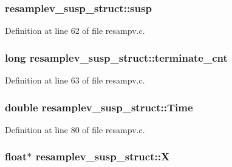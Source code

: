 \subsubsection[{\texorpdfstring{susp}{susp}}]{ resamplev\+\_\+susp\+\_\+struct\+::susp}\hypertarget{structresamplev__susp__struct_a3cff55d39d48a620fe191cce27d1cb21}{}\label{structresamplev__susp__struct_a3cff55d39d48a620fe191cce27d1cb21}


Definition at line 62 of file resampv.\+c.

\subsubsection[{\texorpdfstring{terminate\+\_\+cnt}{terminate_cnt}}]{\setlength{\rightskip}{0pt plus 5cm}long resamplev\+\_\+susp\+\_\+struct\+::terminate\+\_\+cnt}\hypertarget{structresamplev__susp__struct_a5d67ef3f0f6a444343cddcd7154f0d70}{}\label{structresamplev__susp__struct_a5d67ef3f0f6a444343cddcd7154f0d70}


Definition at line 63 of file resampv.\+c.

\subsubsection[{\texorpdfstring{Time}{Time}}]{\setlength{\rightskip}{0pt plus 5cm}double resamplev\+\_\+susp\+\_\+struct\+::\+Time}\hypertarget{structresamplev__susp__struct_a6df75594d65cde48238fc64f0482a12b}{}\label{structresamplev__susp__struct_a6df75594d65cde48238fc64f0482a12b}


Definition at line 80 of file resampv.\+c.

\subsubsection[{\texorpdfstring{X}{X}}]{\setlength{\rightskip}{0pt plus 5cm}float$\ast$ resamplev\+\_\+susp\+\_\+struct\+::X}\hypertarget{structresamplev__susp__struct_a26dc0976b9e2c6bad54ef4874b2acf55}{}\label{structresamplev__susp__struct_a26dc0976b9e2c6bad54ef4874b2acf55}


